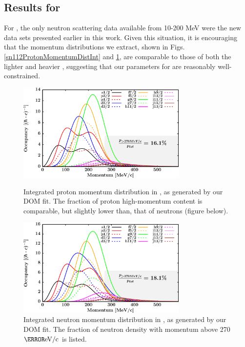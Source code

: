 \subsection{Results for \snTwelve}
For \snTwelve, the only neutron scattering data available from 10-200 MeV were the new data sets
presented earlier in this work. Given this situation, it is encouraging that the momentum
distributions we extract, shown in Figs. \ref{sn112ProtonMomentumDistInt} and
\ref{sn112NeutronMomentumDistInt}, are comparable to those of both the lighter \niEight
and heavier \pbEight, suggesting that our parameters for \snTwelveFour are
reasonably well-constrained.
\begin{figure}[tb]
    \centering
    \includegraphics[width=0.75\textwidth]{figures/sn112_protonLJMomentumDistIntegral.png}
    \caption[Proton momentum distribution in \snTwelve]
    {
        Integrated proton momentum distribution in \snTwelve, as generated
        by our DOM fit. The fraction of proton high-momentum content is
        comparable, but slightly lower than, that of neutrons (figure below).
    }
    \label{sn112ProtonMomentumDistInt}
    \vspace{16pt}
    \includegraphics[width=0.75\textwidth]{figures/sn112_neutronLJMomentumDistIntegral.png}
    \caption[Neutron momentum distributions in \snTwelve]
    {
        Integrated neutron momentum distribution in \snTwelve, as generated
        by our DOM fit. The fraction of neutron density with
        momentum above 270 $\mega\electronvolt/\text{c}$ is listed.
    }
    \label{sn112NeutronMomentumDistInt}
\end{figure}

